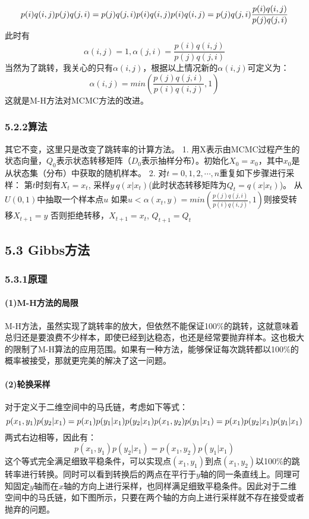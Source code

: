 \documentclass[]{article}
\let\oldparagraph\paragraph
\renewcommand{\paragraph}[1]{\oldparagraph{#1}\mbox{}}
\begin{document}
\[
p(i)q(i,j)p(j)q(j,i)=p(j)q(j,i)p(i)q(i,j) \\ 
p(i)q(i,j)=p(j)q(j,i)\frac{p(i)q(i,j)}{p(j)q(j,i)}
\] 此时有 \[\alpha(i,j) = 1,\alpha(j,i)=\frac{p(i)q(i,j)}{p(j)q(j,i)}\]
当然为了跳转，我关心的只有\(\alpha(i,j)\)，根据以上情况新的\(\alpha(i,j)\)可定义为：
\[
\alpha(i,j)=min(\frac{p(j)q(j,i)}{p(i)q(i,j)},1)
\] 这就是M-H方法对MCMC方法的改进。

\subsubsection{5.2.2算法}\label{-1}

其它不变，这里只是改变了跳转率的计算方法。 1.
用X表示由MCMC过程产生的状态向量，\(Q_0\)表示状态转移矩阵（\(D_0\)表示抽样分布）。初始化\(X_0=x_0\)，其中\(x_0\)是从状态集（分布）中获取的随机样本。
2. 对\(t = 0, 1, 2, \cdots,n\)重复如下步骤进行采样：
第\(t\)时刻有\(X_t=x_t\),
采样\(y~q(x|x_t)\)(此时状态转移矩阵为\(Q_t=q(x|x_t)\))。
从\(U(0,1)\)中抽取一个样本点\(u\)
如果\(u<\alpha(x_t, y)=min(\frac{p(j)q(j,i)}{p(i)q(i,j)},1)\)则接受转移\(X_{t+1}=y\)
否则拒绝转移，\(X_{t+1}=x_t\), \(Q_{t+1} = Q_t\)

\subsection{5.3 Gibbs方法}\label{gibbs}

\subsubsection{5.3.1原理}\label{-2}

\paragraph{(1)M-H方法的局限}\label{m-h}

M-H方法，虽然实现了跳转率的放大，但依然不能保证100\%的跳转，这就意味着总归还是要浪费不少样本，即使已经到达稳态，也还是经常要抛弃样本。这也极大的限制了M-H算法的应用范围。如果有一种方法，能够保证每次跳转都以100\%的概率被接受，那就更完美的解决了这一问题。

\paragraph{(2)轮换采样}

对于定义于二维空间中的马氏链，考虑如下等式： \[
p(x_1, y_1)p(y_2|x_1)=p(x_1)p(y_1|x_1)p(y_2|x_1) \\
p(x_1, y_2)p(y_1|x_1)=p(x_1)p(y_2|x_1)p(y_1|x_1)
\] 两式右边相等，因此有： \[
p(x_1, y_1)p(y_2|x_1)=p(x_1, y_2)p(y_1|x_1)
\]
这个等式完全满足细致平稳条件，可以实现点\((x_1,y_1)\)到点\((x_1,y_2)\)以100\%的跳转率进行转换。同时可以看到转换后的两点在平行于\(y\)轴的同一条直线上。同理可知固定\(y\)轴而在\(x\)轴的方向上进行采样，也同样满足细致平稳条件。因此对于二维空间中的马氏链，如下图所示，只要在两个轴的方向上进行采样就不存在接受或者抛弃的问题。
\end{document}
